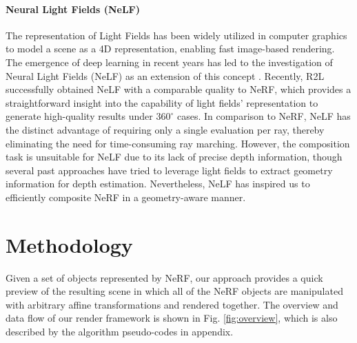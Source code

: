 \documentclass[letterpaper]{article} %
\begin{document}
\paragraph{Neural Light Fields (NeLF)}
The representation of Light Fields has been widely utilized in computer graphics to model a scene as a 4D representation, enabling fast image-based rendering. The emergence of deep learning in recent years has led to the investigation of Neural Light Fields (NeLF) as an extension of this concept
\cite{meng2019high,wizadwongsa2021nex,attal2022learning,sitzmann2021light,suhail2022light}. Recently, R2L \cite{cao2022real, wang2022r2l} successfully obtained NeLF with a comparable quality to NeRF, which provides a straightforward insight into the capability of light fields' representation to generate high-quality results under $360^{\circ}$ cases. In comparison to NeRF, NeLF has the distinct advantage of requiring only a single evaluation per ray, thereby eliminating the need for time-consuming ray marching. However, the composition task is unsuitable for NeLF due to its lack of precise depth information, though several past approaches \cite{1328805, 6910019, Kim2013scene} have tried to leverage light fields to extract geometry information for depth estimation. Nevertheless, NeLF has inspired us to efficiently composite NeRF in a geometry-aware manner.

\section{Methodology}

Given a set of objects represented by NeRF, our approach provides a quick preview of the resulting scene in which all of the NeRF objects are manipulated with arbitrary affine transformations and rendered together. The overview and data flow of our render framework is shown in Fig. \ref{fig:overview}, which is also described by the  algorithm pseudo-codes in appendix. 
\end{document}
